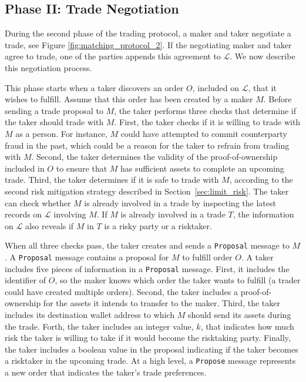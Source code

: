 \subsection*{Phase II: Trade Negotiation}
\label{sec:phase_clearing}

During the second phase of the \ModelName{} trading protocol, a maker and taker negotiate a trade, see Figure \ref{fig:matching_protocol_2}.
If the negotiating maker and taker agree to trade, one of the parties appends this agreement to $ \mathcal{L} $.
We now describe this negotiation process.

This phase starts when a taker discovers an order $ O $, included on $ \mathcal{L} $, that it wishes to fulfill.
Assume that this order has been created by a maker $ M $.
Before sending a trade proposal to $ M $, the taker performs three checks that determine if the taker should trade with $ M $.
First, the taker checks if it is willing to trade with $ M $ as a person.
For instance, $ M $ could have attempted to commit counterparty fraud in the past, which could be a reason for the taker to refrain from trading with $ M $.
Second, the taker determines the validity of the proof-of-ownership included in $ O $ to ensure that $ M $ has sufficient assets to complete an upcoming trade.
Third, the taker determines if it is safe to trade with $ M $, according to the second risk mitigation strategy described in Section~\ref{sec:limit_risk}.
The taker can check whether $ M $ is already involved in a trade by inspecting the latest records on $ \mathcal{L} $ involving $ M $.
If $ M $ is already involved in a trade $ T $, the information on $ \mathcal{L} $ also reveals if $ M $ in $ T $ is a risky party or a risktaker.

When all three checks pass, the taker creates and sends a \texttt{Proposal} message to $ M $.
A \texttt{Proposal} message contains a proposal for $ M $ to fulfill order $ O $.
A taker includes five pieces of information in a \texttt{Proposal} message.
First, it includes the identifier of $ O $, so the maker knows which order the taker wants to fulfill (a trader could have created multiple orders).
Second, the taker includes a proof-of-ownership for the assets it intends to transfer to the maker.
Third, the taker includes its destination wallet address to which $ M $ should send its assets during the trade.
Forth, the taker includes an integer value, $ k $, that indicates how much risk the taker is willing to take if it would become the risktaking party.
Finally, the taker includes a boolean value in the proposal indicating if the taker becomes a risktaker in the upcoming trade.
At a high level, a \texttt{Propose} message represents a new order that indicates the taker's trade preferences.

